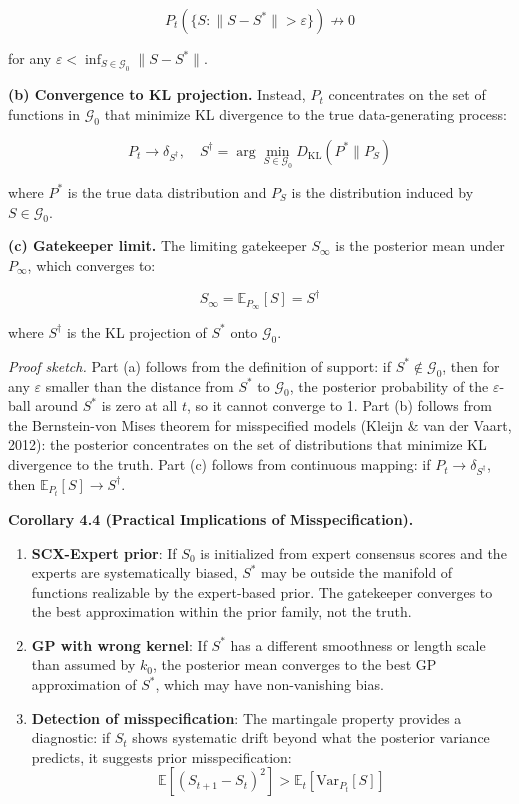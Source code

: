 \documentclass[
  12pt,
]{article}
\begin{document}
\[
P_t(\{S: \|S - S^*\| > \varepsilon\}) \not\to 0
\]

for any \(\varepsilon < \inf_{S \in \mathcal{G}_0} \|S - S^*\|\).

\textbf{(b) Convergence to KL projection.} Instead, \(P_t\) concentrates
on the set of functions in \(\mathcal{G}_0\) that minimize KL divergence
to the true data-generating process:

\[
P_t \to \delta_{S^\dagger}, \quad S^\dagger = \arg\min_{S \in \mathcal{G}_0} D_{\text{KL}}(P^* \parallel P_S)
\]

where \(P^*\) is the true data distribution and \(P_S\) is the
distribution induced by \(S \in \mathcal{G}_0\).

\textbf{(c) Gatekeeper limit.} The limiting gatekeeper \(S_\infty\) is
the posterior mean under \(P_\infty\), which converges to:

\[
S_\infty = \mathbb{E}_{P_\infty}[S] = S^\dagger
\]

where \(S^\dagger\) is the KL projection of \(S^*\) onto
\(\mathcal{G}_0\).

\emph{Proof sketch.} Part (a) follows from the definition of support: if
\(S^* \notin \mathcal{G}_0\), then for any \(\varepsilon\) smaller than
the distance from \(S^*\) to \(\mathcal{G}_0\), the posterior
probability of the \(\varepsilon\)-ball around \(S^*\) is zero at all
\(t\), so it cannot converge to 1. Part (b) follows from the
Bernstein-von Mises theorem for misspecified models (Kleijn \& van der
Vaart, 2012): the posterior concentrates on the set of distributions
that minimize KL divergence to the truth. Part (c) follows from
continuous mapping: if \(P_t \to \delta_{S^\dagger}\), then
\(\mathbb{E}_{P_t}[S] \to S^\dagger\).

\textbf{Corollary 4.4 (Practical Implications of Misspecification).}

\begin{enumerate}
\def\labelenumi{\arabic{enumi}.}
\item
  \textbf{SCX-Expert prior}: If \(S_0\) is initialized from expert
  consensus scores and the experts are systematically biased, \(S^*\)
  may be outside the manifold of functions realizable by the
  expert-based prior. The gatekeeper converges to the best approximation
  within the prior family, not the truth.
\item
  \textbf{GP with wrong kernel}: If \(S^*\) has a different smoothness
  or length scale than assumed by \(k_0\), the posterior mean converges
  to the best GP approximation of \(S^*\), which may have non-vanishing
  bias.
\item
  \textbf{Detection of misspecification}: The martingale property
  provides a diagnostic: if \(S_t\) shows systematic drift beyond what
  the posterior variance predicts, it suggests prior misspecification:
  \[
  \mathbb{E}[(S_{t+1} - S_t)^2] > \mathbb{E}_t[\text{Var}_{P_t}[S]]
  \]
\end{enumerate}
\end{document}
